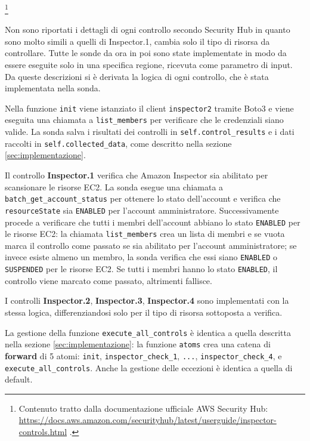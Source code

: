 \footnote{Contenuto tratto dalla documentazione ufficiale AWS Security Hub: \url{https://docs.aws.amazon.com/securityhub/latest/userguide/inspector-controls.html} .}

Non sono riportati i dettagli di ogni controllo secondo Security Hub in quanto sono molto simili a quelli di Inspector.1, cambia solo il tipo di risorsa da controllare. Tutte le sonde da ora in poi sono state implementate in modo da essere eseguite solo in una specifica regione, ricevuta come parametro di input. Da queste descrizioni si è derivata la logica di ogni controllo, che è stata implementata nella sonda.


Nella funzione \texttt{init} viene istanziato il client \texttt{inspector2} tramite Boto3 e viene eseguita una chiamata a \texttt{list\_members} per verificare che le credenziali siano valide. La sonda salva i risultati dei controlli in \texttt{self.control\_results} e i dati raccolti in \texttt{self.collected\_data}, come descritto nella sezione \ref{sec:implementazione}. 

Il controllo \textbf{Inspector.1} verifica che Amazon Inspector sia abilitato per scansionare le risorse EC2. La sonda esegue una chiamata a \texttt{batch\_get\_account\_status} per ottenere lo stato dell'account e verifica che \texttt{resourceState} sia \texttt{ENABLED} per l'account amministratore. Successivamente procede a verificare che tutti i membri dell'account abbiano lo stato \texttt{ENABLED} per le risorse EC2: la chiamata \texttt{list\_members} crea un lista di membri e se vuota marca il controllo come passato se sia abilitato per l'account amministratore; se invece esiste almeno un membro, la sonda verifica che essi siano \texttt{ENABLED} o \texttt{SUSPENDED} per le risorse EC2. Se tutti i membri hanno lo stato \texttt{ENABLED}, il controllo viene marcato come passato, altrimenti fallisce.

I controlli \textbf{Inspector.2}, \textbf{Inspector.3}, \textbf{Inspector.4} sono implementati con la stessa logica, differenziandosi solo per il tipo di risorsa sottoposta a verifica.

La gestione della funzione \texttt{execute\_all\_controls} è identica a quella descritta nella sezione \ref{sec:implementazione}: la funzione \texttt{atoms} crea una catena di \textbf{forward} di 5 atomi: \texttt{init}, \texttt{inspector\_check\_1}, \texttt{...}, \texttt{inspector\_check\_4}, e \texttt{execute\_all\_controls}. Anche la gestione delle eccezioni è identica a quella di default. 


